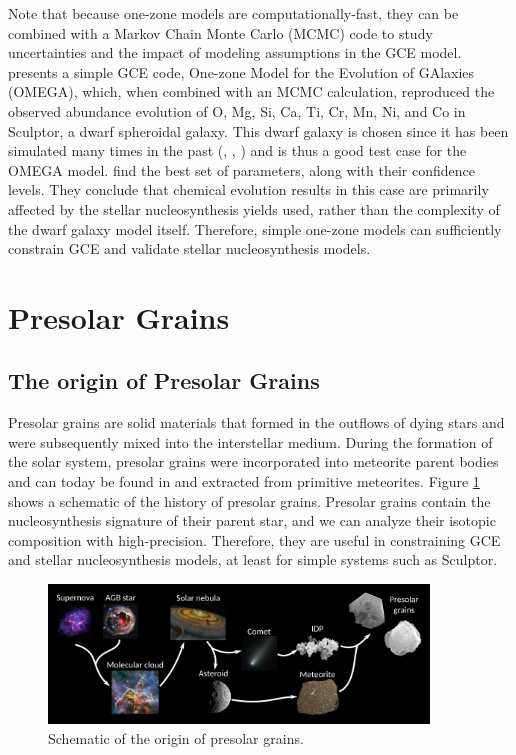 \documentclass{brandeis-thesis3.2}
\begin{document}
Note that because one-zone models are computationally-fast, they can be combined with a Markov Chain Monte Carlo (MCMC) code to study uncertainties and the impact of modeling assumptions in the GCE model. \cite{cote17} presents a simple GCE code, One-zone Model for the Evolution of GAlaxies (OMEGA), which, when combined with an MCMC calculation, reproduced the observed abundance evolution of O, Mg, Si, Ca, Ti, Cr, Mn, Ni, and Co in Sculptor, a dwarf spheroidal galaxy. This dwarf galaxy is chosen since it has been simulated many times in the past (\citealt{Vincenzo_2014}, \citealt{Homma_2015}, \citealt{Kobayashi_2015}) and is thus a good test case for the OMEGA model. \cite{cote17} find the best set of parameters, along with their confidence levels. They conclude that chemical evolution results in this case are primarily affected by the stellar nucleosynthesis yields used, rather than the complexity of the dwarf galaxy model itself. Therefore, simple one-zone models can sufficiently constrain GCE and validate stellar nucleosynthesis models.

\section{Presolar Grains} \label{grain intro}
\subsection{The origin of Presolar Grains}
Presolar grains are solid materials that formed in the outflows of dying stars and were subsequently mixed into the interstellar medium. During the formation of the solar system, presolar grains were incorporated into meteorite parent bodies and can today be found in and extracted from primitive meteorites. Figure \ref{fig:presolar_origin} shows a schematic of the history of presolar grains. Presolar grains contain the nucleosynthesis signature of their parent star, and we can analyze their isotopic composition with high-precision. Therefore, they are useful in constraining GCE and stellar nucleosynthesis models, at least for simple systems such as Sculptor.

\begin{figure}[H]
\centering
\includegraphics[width = 0.9\textwidth]{figs/presolar_grains_origin_1600.png}
\caption{Schematic of the origin of presolar grains.}
\label{fig:presolar_origin}
\end{figure}
\end{document}
